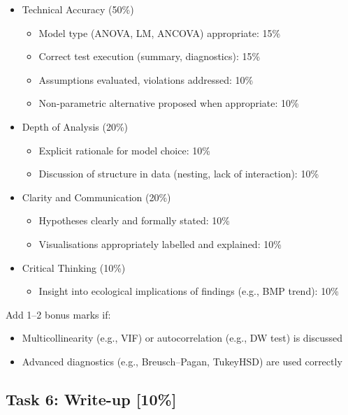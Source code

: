 \documentclass[
  10pt,
]{article}
\providecommand{\tightlist}{%
  \setlength{\itemsep}{0pt}\setlength{\parskip}{0pt}}
\begin{document}
\begin{itemize}
\tightlist
\item
  Technical Accuracy (50\%)

  \begin{itemize}
  \tightlist
  \item
    Model type (ANOVA, LM, ANCOVA) appropriate: 15\%
  \item
    Correct test execution (summary, diagnostics): 15\%
  \item
    Assumptions evaluated, violations addressed: 10\%
  \item
    Non-parametric alternative proposed when appropriate: 10\%
  \end{itemize}
\item
  Depth of Analysis (20\%)

  \begin{itemize}
  \tightlist
  \item
    Explicit rationale for model choice: 10\%
  \item
    Discussion of structure in data (nesting, lack of interaction): 10\%
  \end{itemize}
\item
  Clarity and Communication (20\%)

  \begin{itemize}
  \tightlist
  \item
    Hypotheses clearly and formally stated: 10\%
  \item
    Visualisations appropriately labelled and explained: 10\%
  \end{itemize}
\item
  Critical Thinking (10\%)

  \begin{itemize}
  \tightlist
  \item
    Insight into ecological implications of findings (e.g., BMP trend):
    10\%
  \end{itemize}
\end{itemize}

Add 1--2 bonus marks if:

\begin{itemize}
\tightlist
\item
  Multicollinearity (e.g., VIF) or autocorrelation (e.g., DW test) is
  discussed
\item
  Advanced diagnostics (e.g., Breusch--Pagan, TukeyHSD) are used
  correctly
\end{itemize}

\subsection{Task 6: Write-up {[}10\%{]}}\label{task-6-write-up-10}
\end{document}
